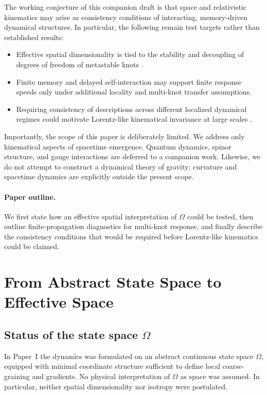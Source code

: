 \documentclass[reprint,amsmath,amssymb,aps,prl,nofootinbib,floatfix]{revtex4-2}
\begin{document}
The working conjecture of this companion draft is that space and relativistic kinematics may arise as consistency conditions of interacting, memory-driven dynamical structures. In particular, the following remain test targets rather than established results:
\begin{itemize}
\item Effective spatial dimensionality is tied to the stability and decoupling of degrees of freedom of metastable knots \cite{Ambjorn2005Spectral,Benedetti2009Spectral,Carlip2017Dimension}.
\item Finite memory and delayed self-interaction may support finite response speeds only under additional locality and multi-knot transfer assumptions.
\item Requiring consistency of descriptions across different localized dynamical regimes could motivate Lorentz-like kinematical invariance at large scales \cite{Volovik2003Universe,Liberati2013Lorentz}.
\end{itemize}

Importantly, the scope of this paper is deliberately limited. We address only kinematical aspects of spacetime emergence. Quantum dynamics, spinor structure, and gauge interactions are deferred to a companion work. Likewise, we do not attempt to construct a dynamical theory of gravity; curvature and spacetime dynamics are explicitly outside the present scope.

\paragraph{Paper outline.}
We first state how an effective spatial interpretation of $\Omega$ could be tested, then outline finite-propagation diagnostics for multi-knot response, and finally describe the consistency conditions that would be required before Lorentz-like kinematics could be claimed.


\section{From Abstract State Space to Effective Space}\label{sec:effective_space}
\subsection{Status of the state space $\Omega$}

In Paper~I the dynamics was formulated on an abstract continuous state space $\Omega$, equipped with minimal coordinate structure sufficient to define local coarse-graining and gradients.
No physical interpretation of $\Omega$ as space was assumed.
In particular, neither spatial dimensionality nor isotropy were postulated.
\end{document}
